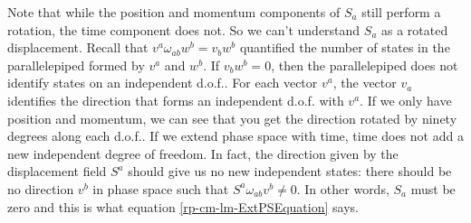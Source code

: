 Note that while the position and momentum components of $S_a$ still perform a rotation, the time component does not. So we can't understand $S_a$ as a rotated displacement. Recall that $v^a \omega_{ab} w^b = v_b w^b$ quantified the number of states in the parallelepiped formed by $v^a$ and $w^b$. If $v_b w^b = 0$, then the parallelepiped does not identify states on an independent d.o.f.. For each vector $v^a$, the vector $v_a$ identifies the direction that forms an independent d.o.f. with $v^a$. If we only have position and momentum, we can see that you get the direction rotated by ninety degrees along each d.o.f.. If we extend phase space with time, time does not add a new independent degree of freedom. In fact, the direction given by the displacement field $S^a$ should give us no new independent states: there should be no direction $v^b$ in phase space such that $S^a \omega_{ab} v^b \neq 0$. In other words, $S_a$ must be zero and this is what equation \ref{rp-cm-lm-ExtPSEquation} says.

